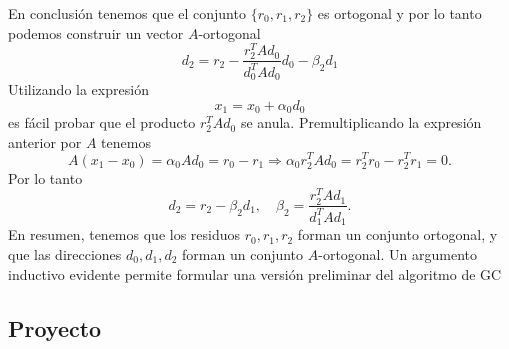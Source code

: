 \documentclass[12pt]{article}
\begin{document}

En conclusi\'on tenemos que el conjunto $\{r_0, r_1, r_2 \}$ es ortogonal y por lo tanto podemos construir un vector $A$-ortogonal
\[
   d_2 = r_2 - \frac{r_2^TAd_0}{d_0^TAd_0} d_0 - \beta_2 d_1
\]
Utilizando la expresi\'on 
\[
   x_1 = x_0 + \alpha_0 d_0
\]
es f\'acil probar que el producto $r_2^TAd_0$ se anula. Premultiplicando la expresi\'on anterior por $A$ tenemos
\[
    A(x_1 - x_0) =  \alpha_0 Ad_0 = r_0 - r_1 \Longrightarrow  \alpha_0 r_2^TAd_0 = r_2^Tr_0 -r_2^Tr_1 = 0.
\]
Por lo tanto
\[
   d_2 = r_2 - \beta_2 d_1, \quad  \beta_2 = \frac{r_2^TAd_1}{d_1^TAd_1}.
\]
En resumen, tenemos que los residuos $r_0,r_1,r_2$ forman un conjunto ortogonal, y que las direcciones $d_0, d_1, d_2$ forman un conjunto $A$-ortogonal. Un argumento inductivo evidente permite formular una versi\'on preliminar del algoritmo de GC


\subsection*{Proyecto}
\end{document}
